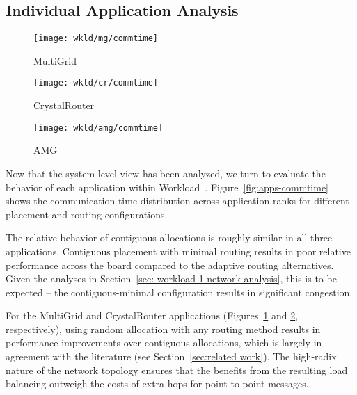\subsection{Individual Application Analysis}
\label{sec: workload-1 app analysis}

\begin{figure*}[t!]
    \centering
    \begin{subfigure}[t]{0.32\textwidth}
        \centering
        \texttt{[image: wkld/mg/commtime]}
        \caption{MultiGrid}
        \label{fig:mg-commtime}
    \end{subfigure}%
    \begin{subfigure}[t]{0.32\textwidth}
        \centering
        \texttt{[image: wkld/cr/commtime]}
        \caption{CrystalRouter}
        \label{fig:cr-commtime}
    \end{subfigure}%
    \begin{subfigure}[t]{0.32\textwidth}
        \centering
        \texttt{[image: wkld/amg/commtime]}
        \caption{AMG}
        \label{fig:amg-commtime}
    \end{subfigure}%
    \caption{Communication time distribution across application ranks in Workload~.}
   \label{fig:apps-commtime}
\end{figure*}

Now that the system-level view has been analyzed, we turn to evaluate the
behavior of each application within Workload~.
Figure~\ref{fig:apps-commtime} shows the communication time distribution across
application ranks for different placement and routing configurations.

The relative behavior of contiguous allocations is roughly similar in all three
applications. Contiguous placement with minimal routing results in poor relative
performance across the board compared to the adaptive routing alternatives.
Given the analyses in Section~\ref{sec: workload-1 network analysis}, this is to
be expected -- the contiguous-minimal configuration results in significant
congestion.

For the MultiGrid and CrystalRouter applications (Figures~\ref{fig:mg-commtime} and
\ref{fig:cr-commtime}, respectively), using random allocation with any routing
method results in performance improvements over contiguous allocations, which is
largely in agreement with the literature (see Section~\ref{sec:related work}).
The high-radix nature of the
network topology ensures that the benefits from the resulting load balancing
outweigh the costs of extra hops for point-to-point messages.


